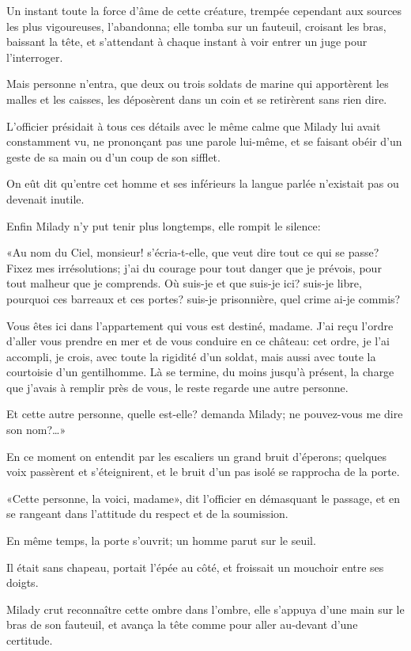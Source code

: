 Un instant toute la force d'âme de cette créature, trempée cependant aux sources les plus vigoureuses, l'abandonna; elle tomba sur un fauteuil, croisant les bras, baissant la tête, et s'attendant à chaque instant à voir entrer un juge pour l'interroger. 

Mais personne n'entra, que deux ou trois soldats de marine qui apportèrent les malles et les caisses, les déposèrent dans un coin et se retirèrent sans rien dire. 

L'officier présidait à tous ces détails avec le même calme que Milady lui avait constamment vu, ne prononçant pas une parole lui-même, et se faisant obéir d'un geste de sa main ou d'un coup de son sifflet. 

On eût dit qu'entre cet homme et ses inférieurs la langue parlée n'existait pas ou devenait inutile. 

Enfin Milady n'y put tenir plus longtemps, elle rompit le silence: 

«Au nom du Ciel, monsieur! s'écria-t-elle, que veut dire tout ce qui se passe? Fixez mes irrésolutions; j'ai du courage pour tout danger que je prévois, pour tout malheur que je comprends. Où suis-je et que suis-je ici? suis-je libre, pourquoi ces barreaux et ces portes? suis-je prisonnière, quel crime ai-je commis? 

\speak  Vous êtes ici dans l'appartement qui vous est destiné, madame. J'ai reçu l'ordre d'aller vous prendre en mer et de vous conduire en ce château: cet ordre, je l'ai accompli, je crois, avec toute la rigidité d'un soldat, mais aussi avec toute la courtoisie d'un gentilhomme. Là se termine, du moins jusqu'à présent, la charge que j'avais à remplir près de vous, le reste regarde une autre personne. 

\speak  Et cette autre personne, quelle est-elle? demanda Milady; ne pouvez-vous me dire son nom?\dots» 

En ce moment on entendit par les escaliers un grand bruit d'éperons; quelques voix passèrent et s'éteignirent, et le bruit d'un pas isolé se rapprocha de la porte. 

«Cette personne, la voici, madame», dit l'officier en démasquant le passage, et en se rangeant dans l'attitude du respect et de la soumission. 

En même temps, la porte s'ouvrit; un homme parut sur le seuil. 

Il était sans chapeau, portait l'épée au côté, et froissait un mouchoir entre ses doigts. 

Milady crut reconnaître cette ombre dans l'ombre, elle s'appuya d'une main sur le bras de son fauteuil, et avança la tête comme pour aller au-devant d'une certitude. 

